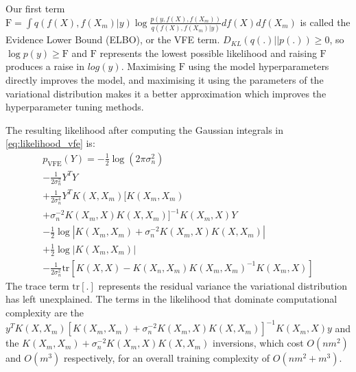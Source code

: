 Our first term $\text{F} = \int q(f(X), f(X_m) | y) \log \frac{p(y, f(X), f(X_m))}{q(f(X), f(X_m) | y)} df(X) df(X_m)$ is called the Evidence Lower Bound (ELBO), or the VFE term. $D_{KL}(q(.) || p(.)) \geq 0$, so $\log p(y) \geq \text{F}$ and $\text{F}$ represents the lowest possible likelihood and raising $\text{F}$ produces a raise in $log(y)$. Maximising $\text{F}$ using the model hyperparameters directly improves the model, and maximising it using the parameters of the variational distribution makes it a better approximation which improves the hyperparameter tuning methods.

The resulting likelihood after computing the Gaussian integrals in \ref{eq:likelihood_vfe} is:
\begin{equation*}
    \begin{aligned}
        p_{\text{VFE}}(Y) = -\frac{1}{2} \log(2 \pi \sigma_n^2) \\ 
        - \frac{1}{2\sigma_n^2} Y^T Y \\
        + \frac{1}{2\sigma_n^4} Y^T K(X, X_m) [K(X_m, X_m) \\
        + \sigma_n^{-2} K(X_m, X) K(X, X_m)]^{-1} K(X_m, X) Y \\
        - \frac{1}{2} \log | K(X_m, X_m) + \sigma_n^{-2} K(X_m, X) K(X, X_m) | \\
        + \frac{1}{2} \log | K(X_m, X_m) | \\
        - \frac{1}{2 \sigma_n^2} \text{tr} \left[ K(X, X) - K(X_n, X_m) K(X_m, X_m)^{-1} K(X_m, X) \right]
    \end{aligned}
\end{equation*}
The trace term $\text{tr}[.]$ represents the residual variance the variational distribution has left unexplained. The terms in the likelihood that dominate computational complexity are the $y^T K(X, X_m) [K(X_m, X_m) + \sigma_n^{-2} K(X_m, X) K(X, X_m)]^{-1} K(X_m, X) y$ and the $K(X_m, X_m) + \sigma_n^{-2} K(X_m, X) K(X, X_m)$ inversions, which cost $O(nm^2)$ and $O(m^3)$ respectively, for an overall training complexity of $O(nm^2 + m^3)$.

